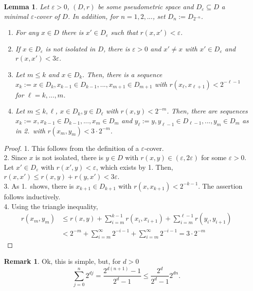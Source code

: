 \documentclass{article}
\newtheorem{lemma}[proposition]{Lemma}
\theoremstyle{definition}
\newtheorem{remark}[proposition]{Remark}
\theoremstyle{step} \newtheorem{step}{Step}
\begin{document}
\begin{lemma}
  Let $\varepsilon>0$, $(D,r)$ be some pseudometric space and $D_\varepsilon \subseteq D$ a minimal $\varepsilon$-cover of $D$. In addition, for $n=1,2,...$, set $D_n := D_{2^{-n}}$.
  \begin{enumerate}
    \item For any $x\in D$ there is $x' \in D_\varepsilon$ such that $r(x,x') < \varepsilon$.
    \item If $x \in D_\varepsilon$ is not isolated in $D$, there is $\varepsilon>0$ and $x' \neq x$ with $x'\in D_\varepsilon$ and $r(x,x') < 3 \varepsilon$.
    \item Let $m\leq k$ and $x \in D_k$. Then, there is a sequence $x_k :=x \in D_k, x_{k-1} \in D_{k-1},...,x_{m+1} \in D_{m+1}$ with $r(x_\ell, x_{\ell+1}) < 2^{-\ell-1}$ for $\ell=k,...,m$.
    \item  Let $m \leq k,\ell$, $x \in D_k, y\in D_\ell$ with $r(x,y) < 2^{-m}$. Then, there are sequences $x_k :=x, x_{k-1} \in D_{k-1},...,x_{m} \in D_{m}$ and $y_\ell :=y, y_{\ell-1} \in D_{\ell-1},...,y_{m} \in D_{m}$ as in 2.\ with $r(x_{m}, y_{m}) < 3\cdot 2^{-m}$.
  \end{enumerate}
\end{lemma}

\begin{proof}
  1. This follows from the definition of a $\varepsilon$-cover.
  \\ 2. Since $x$ is not isolated, there is $y \in D$ with $r(x,y) \in (\varepsilon, 2\varepsilon)$ for some $\varepsilon>0$. Let $x' \in D_\varepsilon$ with $r(x',y) < \varepsilon$, which exists by 1. Then, $r(x,x') \leq r(x,y) + r(y,x') < 3\varepsilon$.
  \\ 3. As 1.\ shows, there is $x_{k+1} \in D_{k+1}$ with $r(x, x_{k+1}) < 2^{-k-1}$. The assertion follows inductively.
  \\ 4. Using the triangle inequality,
  \begin{align*}
    r(x_{m}, y_{m}) & \leq r(x,y) + \sum_{i=m}^{k-1} r(x_i, x_{i+1}) + \sum_{i=m}^{\ell-1} r(y_i, y_{i+1}) \\ & < 2^{-m} + \sum_{i=m}^\infty 2^{-i-1} + \sum_{i=m}^\infty 2^{-i-1}  = 3\cdot 2^{-m}
  \end{align*}
\end{proof}

\begin{remark}
  Ok, this is simple, but, for $d>0$
  $$ \sum_{j=0}^n 2^{dj} = \frac{2^{d(n+1)}-1}{2^d-1} \leq \frac{2^d}{2^d-1}2^{dn}. $$
\end{remark}
\end{document}
